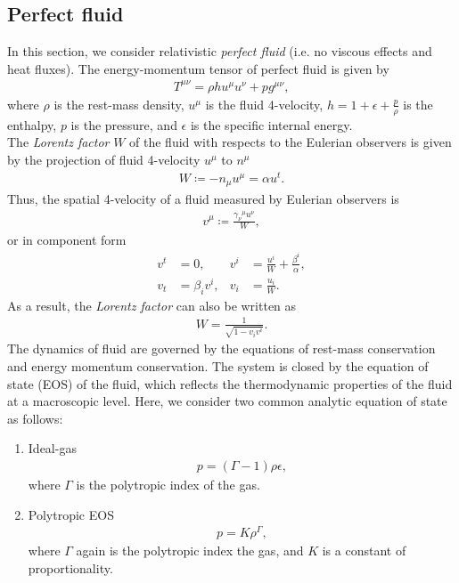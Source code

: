 \subsection{Perfect fluid}
\label{section2.1.1}
In this section, we consider relativistic \textit{perfect fluid} (i.e. no viscous effects and heat fluxes).
The energy-momentum tensor of perfect fluid is given by
\begin{align}
    T^{\mu\nu} = \rho h u^\mu u^\nu + p g^{\mu\nu},
\end{align}
where $\rho$ is the rest-mass density, 
$u^\mu$ is the fluid 4-velocity,
$h = 1 + \epsilon + \frac{p}{\rho}$ is the enthalpy, 
$p$ is the pressure, 
and $\epsilon$ is the specific internal energy.\\
The \textit{Lorentz factor} $W$ of the fluid with respects to the Eulerian observers is given by 
the projection of fluid 4-velocity $u^\mu$ to $n^\mu$
\begin{align}
    W \coloneqq - n_{\mu} u^\mu = \alpha u^t.
\end{align}
Thus, the spatial 4-velocity of a fluid measured by Eulerian observers is
\begin{align}
    v^\mu \coloneqq \frac{\gamma_{\nu}{}^{\mu} u^\nu} {W},
\end{align}
or in component form
\begin{align}
    v^t &= 0, & v^i &=  \frac{u^i}{W} + \frac{\beta^i}{\alpha}, \\
    v_t &= \beta_i v^i, & v_i &= \frac{u_i}{W}.
\end{align}
As a result, the \textit{Lorentz factor} can also be written as
\begin{align}
    W = \frac{1}{\sqrt{1-v_i v^i}}.
\end{align}
The dynamics of fluid are governed by the equations of rest-mass conservation and energy momentum conservation.
The system is closed by the equation of state (EOS) of the fluid,
which reflects the thermodynamic properties of the fluid at a macroscopic level.
Here, we consider two common analytic equation of state as follows:
\begin{enumerate}
    \item Ideal-gas
    \begin{align}
        p = (\Gamma-1)\rho \epsilon,
    \end{align}
    where $\Gamma$ is the polytropic index of the gas.
    \item Polytropic EOS 
    \begin{align}
        p = K\rho^\Gamma,
    \end{align}
    where $\Gamma$ again is the polytropic index the gas, and $K$ is a constant of proportionality.
\end{enumerate}

